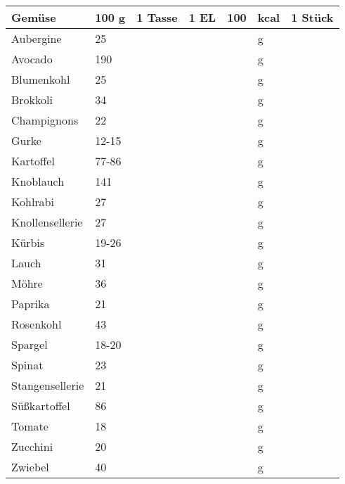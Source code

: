 \begin{tabularx}{\linewidth}{X|l|r|r|rl|r}
Gemüse            &   100 g & 1 Tasse & 1 EL &      100 & kcal    & 1 Stück  \\
\hline
Aubergine         &      25 &         &      &          & g       &          \\
Avocado           &     190 &         &      &          & g       &          \\
Blumenkohl        &      25 &         &      &          & g       &          \\
Brokkoli          &      34 &         &      &          & g       &          \\
Champignons       &      22 &         &      &          & g       &          \\
Gurke             &   12-15 &         &      &          & g       &          \\
Kartoffel         &   77-86 &         &      &          & g       &          \\
Knoblauch         &     141 &         &      &          & g       &          \\
Kohlrabi          &      27 &         &      &          & g       &          \\
Knollensellerie   &      27 &         &      &          & g       &          \\
Kürbis            &   19-26 &         &      &          & g       &          \\
Lauch             &      31 &         &      &          & g       &          \\
Möhre             &      36 &         &      &          & g       &          \\
Paprika           &      21 &         &      &          & g       &          \\
Rosenkohl         &      43 &         &      &          & g       &          \\
Spargel           &   18-20 &         &      &          & g       &          \\
Spinat            &      23 &         &      &          & g       &          \\
Stangensellerie   &      21 &         &      &          & g       &          \\
Süßkartoffel      &      86 &         &      &          & g       &          \\
Tomate            &      18 &         &      &          & g       &          \\
Zucchini          &      20 &         &      &          & g       &          \\
Zwiebel           &      40 &         &      &          & g       &          \\
\end{tabularx}

